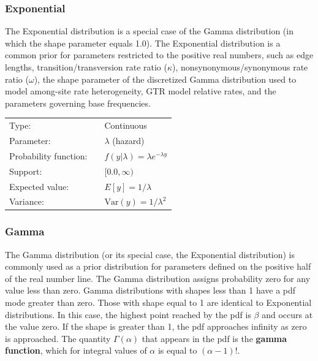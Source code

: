 \documentclass[10pt]{article}
\newcommand{\term}[1]{{\bfseries #1}\index{#1}}	%
\newcommand{\Var}{\mbox{Var}}
\begin{document}
\subsubsection{Exponential}\label{exponentialdist}

The Exponential distribution is a special case of the Gamma distribution (in which the shape parameter equals 1.0). The Exponential distribution is a common prior for parameters restricted to the positive real numbers, such as edge lengths, transition/transversion rate ratio ($\kappa$), nonsynonymous/synonymous rate ratio ($\omega$), the shape parameter of the discretized Gamma distribution used to model among-site rate heterogeneity, GTR model relative rates, and the parameters governing base frequencies.

\begin{tabular}{lcl}
Type:                 & & Continuous \\
Parameter:            & & $\lambda$ (hazard)    \\
Probability function: & & $f(y|\lambda) = \lambda e^{-\lambda y}$ \\
Support:              & & $[0.0,\infty)$     \\
Expected value:       & & $E[y] = 1/\lambda$ \\
Variance:             & & $\Var(y) = 1/\lambda^2$ 
\end{tabular}

\subsubsection{Gamma}\label{gammadist}

The Gamma distribution (or its special case, the Exponential distribution) is commonly used as a prior distribution for parameters defined on the positive half of the real number line. The Gamma distribution assigns probability zero for any value less than zero. Gamma distributions with shapes less than 1 have a pdf mode greater than zero. Those with shape equal to 1 are identical to Exponential distributions. In this case, the highest point reached by the pdf is $\beta$ and occurs at the value zero. If the shape is greater than 1, the pdf approaches infinity as zero is approached. The quantity $\Gamma(\alpha)$ that appears in the pdf is the \term{gamma function}, which for integral values of $\alpha$ is equal to $(\alpha-1)!$.
\end{document}
